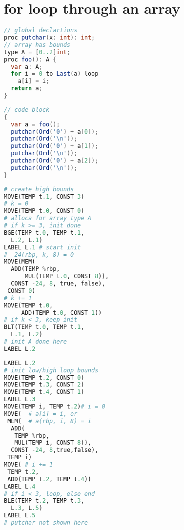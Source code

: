 \section*{for loop through an array}
\begin{minipage}{.5\linewidth}
\begin{lstlisting}[language=Java,morekeywords={proc, type, loop, var, Last},
frame=none,xleftmargin=-1em]
// global declartions
proc putchar(x: int): int;
// array has bounds
type A = [0..2]int;
proc foo(): A {
  var a: A;
  for i = 0 to Last(a) loop
    a[i] = i;
  return a;
}
\end{lstlisting}
\end{minipage}
\begin{minipage}{.5\linewidth}
\begin{lstlisting}[language=Java,morekeywords={var},frame=none,xleftmargin=-.5em]
// code block
{
  var a = foo();
  putchar(Ord('0') + a[0]);
  putchar(Ord('\n'));
  putchar(Ord('0') + a[1]);
  putchar(Ord('\n'));
  putchar(Ord('0') + a[2]);
  putchar(Ord('\n'));
}
\end{lstlisting}
\end{minipage}
\begin{minipage}{.5\linewidth}
\begin{lstlisting}[language=Python,frame=none,xleftmargin=-1em]
# create high bounds
MOVE(TEMP t.1, CONST 3)
# k = 0
MOVE(TEMP t.0, CONST 0)
# alloca for array type A
# if k >= 3, init done
BGE(TEMP t.0, TEMP t.1,
  L.2, L.1)
LABEL L.1 # start init
# -24(rbp, k, 8) = 0
MOVE(MEM(
  ADD(TEMP %rbp,
      MUL(TEMP t.0, CONST 8)),
  CONST -24, 8, true, false),
 CONST 0)
# k += 1
MOVE(TEMP t.0,
     ADD(TEMP t.0, CONST 1))
# if k < 3, keep init
BLT(TEMP t.0, TEMP t.1,
  L.1, L.2)
# init A done here
LABEL L.2
\end{lstlisting}
\end{minipage}
\begin{minipage}{.5\linewidth}
\begin{lstlisting}[language=Python,frame=none,xleftmargin=-0.5em]
LABEL L.2
# init low/high loop bounds
MOVE(TEMP t.2, CONST 0)
MOVE(TEMP t.3, CONST 2)
MOVE(TEMP t.4, CONST 1)
LABEL L.3
MOVE(TEMP i, TEMP t.2)# i = 0
MOVE(  # a[i] = i, or
 MEM(  # a(rbp, i, 8) = i
  ADD(
   TEMP %rbp,
   MUL(TEMP i, CONST 8)),
  CONST -24, 8,true,false),
 TEMP i)
MOVE( # i += 1
 TEMP t.2,
 ADD(TEMP t.2, TEMP t.4))
LABEL L.4
# if i < 3, loop, else end
BLE(TEMP t.2, TEMP t.3,
  L.3, L.5)
LABEL L.5
# putchar not shown here
\end{lstlisting}
\end{minipage}

\
